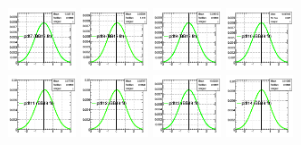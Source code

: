 \begin{figure}[!htbp]
{{\includegraphics[width=0.16\textwidth]{fig/posteriors__pdf7_BB18_fitBBBE161718_ADDGRW.png}
\includegraphics[width=0.16\textwidth]{fig/posteriors__pdf8_BB18_fitBBBE161718_ADDGRW.png}
\includegraphics[width=0.16\textwidth]{fig/posteriors__pdf9_BB18_fitBBBE161718_ADDGRW.png}
\includegraphics[width=0.16\textwidth]{fig/posteriors__pdf10_BB18_fitBBBE161718_ADDGRW.png}\\
\includegraphics[width=0.16\textwidth]{fig/posteriors__pdf11_BB18_fitBBBE161718_ADDGRW.png}
\includegraphics[width=0.16\textwidth]{fig/posteriors__pdf12_BB18_fitBBBE161718_ADDGRW.png}
\includegraphics[width=0.16\textwidth]{fig/posteriors__pdf13_BB18_fitBBBE161718_ADDGRW.png}
\includegraphics[width=0.16\textwidth]{fig/posteriors__pdf14_BB18_fitBBBE161718_ADDGRW.png}
}}
\end{figure}

